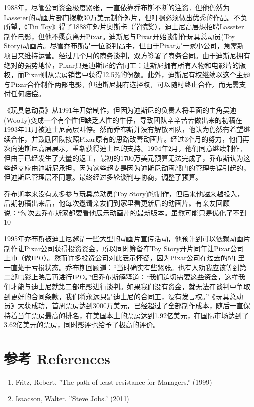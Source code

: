 1988年，尽管公司资金极度紧张，一直依靠乔布斯不断的注资，但他仍然为Lasseter的动画片部门拨款30万美元制作短片，但叮嘱必须做出优秀的作品。不负所望，《Tin Toy》得了1888年短片奥斯卡（学院奖），迪士尼高层想招聘Lasseter制作电影，但他不愿意离开Pixar。迪斯尼与Pixar开始谈制作玩具总动员(Toy Story)动画片。尽管乔布斯是一位谈判高手，但由于Pixar是一家小公司，急需新项目来维持运营。经过几个月的商务谈判，双方签署了商务合同。由于迪斯尼拥有绝对的强势地位，Pixar只是迪斯尼的合同工：迪斯尼拥有所有人物和电影片的版权，而Pixar则从票房销售中获得12.5\%的份额。此外，迪斯尼有权继续以这个主题与Pixar合作制作两部电影，但迪斯尼拥有选择权，可以随时终止合作，而无需支付任何赔偿。

《玩具总动员》从1991年开始制作，但因为迪斯尼的负责人将里面的主角吴迪(Woody)变成一个有个性但缺乏人性的牛仔，导致团队辛辛苦苦做出来的初稿在1993年11月被迪士尼高层叫停。然而乔布斯并没有解散团队，他认为仍然有希望继续合作，并鼓励团队按照Pixar原有的思路改善动画片。经过3个月的努力，他们再次向迪斯尼高层展示，重新获得迪士尼的支持。1994年2月，他们同意继续制作，但由于已经发生了大量的返工，最初的1700万美元预算无法完成了，乔布斯认为这些超支应由迪斯尼承担，因为这些超支是因为迪斯尼动画部门的管理失误引起的，但迪斯尼管理层不同意。最终经过多轮谈判与协商，调整了预算。

乔布斯本来没有太多参与玩具总动员(Toy Story)的制作，但后来他越来越投入，后期初稿出来后，他每次邀请亲友们到家里看更新后的动画片。有亲友回顾说：“每次去乔布斯家都要看他展示动画片的最新版本。虽然可能只是优化了不到10%

1995年乔布斯被迪士尼邀请一些大型的动画片宣传活动，他预计到可以依赖动画片制作让Pixar公司获得投资资金，所以同时筹备在Toy Story开片同年让Pixar公司上市（做IPO）。然而许多投资公司对此表示怀疑，因为Pixar公司在过去的5年里一直处于亏损状态。乔布斯回顾道：“当时确实有些紧张。也有人劝我应该等到第二部电影上映后再进行IPO。”但乔布斯解释道：“我们迫切需要这些资金，这样我们才能与迪士尼就第二部电影进行谈判。如果我们没有资金，就无法在谈判中争取到更好的合同条款，我们将永远只是迪士尼的合同工，没有发言权。”《玩具总动员》大获成功，首周票房达到3000万美元，已经超过了全部制作成本，随后一直保持着当年票房最高的排名，在美国本土的票房达到1.92亿美元，在国际市场达到了3.62亿美元的票房，同时影评也给予了极高的评价。

\hypertarget{ux9644ux4ef6}{%
\section{参考 References}\label{ux9644ux4ef6}}

\begin{enumerate}
\tightlist
\item
  Fritz, Robert. ''The path of least resistance for Managers.'' (1999)
\item
  Isaacson, Walter. ''Steve Jobs.'' (2011)
\end{enumerate}




